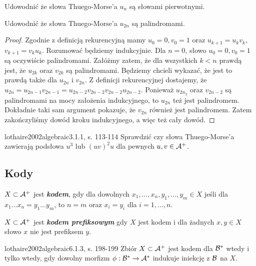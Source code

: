 \begin{problem}{}{}
  Udowodnić że słowa Thuego-Morse'a $u_{n}$ są słowami pierwotnymi.
\end{problem}

\begin{problem}{}{}
  Udowodnić że słowa Thuego-Morse'a $u_{2n}$ są palindromami.
\end{problem}

\begin{proof}
Zgodnie z definicją rekurencyjną mamy $u_0=0,v_0=1$ oraz $u_{k+1}=u_kv_k$, $v_{k+1}=v_ku_k$. Rozumować będziemy indukcyjnie. Dla $n=0$, słowo $u_0=0, v_0=1$ są oczywiście palindromami. Załóżmy zatem, że dla wszystkich $k < n$ prawdą jest, że $u_{2k}$ oraz $v_{2k}$ są palindromami. Będziemy chcieli wykazać, że jest to prawdą także dla $u_{2n}$ i $v_{2n}$. Z definicji rekurencyjnej dostajemy, że $u_{2n}=u_{2n-1}v_{2n-1}=u_{2n-2}v_{2n-2}v_{2n-2}u_{2n-2}$. Ponieważ $u_{2n_2}$ oraz $v_{2n-2}$ są palindromami na mocy założenia indukcyjnego, to $u_{2n}$ też jest palindromem. Dokładnie taki sam argument pokazuje, że $v_{2n}$ również jest palindromem. Zatem zakończyliśmy dowód kroku indukcyjnego, a więc też cały dowód.
\end{proof}

\begin{problem}{lothaire2002algebraic}{3.1.1, s. 113-114}
  Sprawdzić czy słowa Thuego-Morse'a zawierają podsłowa $u^3$ lub $(uv)^2u$ dla pewnych $u, v \in \mathcal{A}^+$.
\end{problem}

\subsection{Kody}

\begin{definition}{}{}
  $X \subset \mathcal{A}^+$ jest {\bf\textit{kodem}}, gdy dla dowolnych $x_1, \ldots, x_n, y_1, \ldots, y_m \in X$ jeśli dla $x_1 \ldots x_n = y_1 \ldots y_m$, to $n = m$ oraz $x_i = y_i$ dla $i = 1, \ldots, n$.
\end{definition}

\begin{definition}{}{}
  $X \subset \mathcal{A}^+$ jest {\bf\textit{kodem prefiksowym}} gdy $X$ jest kodem i dla żadnych $x, y \in X$ słowo $x$ nie jest prefiksem $y$.
\end{definition}

\begin{problem}{lothaire2002algebraic}{6.1.3, s. 198-199}
  Zbiór $X \subset \mathcal{A}^+$ jest kodem dla $\mathcal{B}^*$ wtedy i tylko wtedy, gdy dowolny morfizm $\phi: \mathcal{B}^* \to \mathcal{A}^*$ indukuje iniekcję z $\mathcal{B}$ na $X$.
\end{problem}


